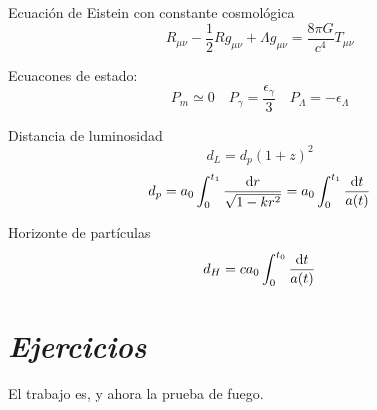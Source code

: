 \begin{multicols}{2}
\begin{Formulario}
    Ecuación de Eistein con constante cosmológica 
	\begin{equation*}
		R_{\mu \nu} - \frac{1}{2} R g_{\mu \nu} + \Lambda g_{\mu \nu} = \frac{8 \pi G}{c^4} T_{\mu \nu}
	\end{equation*}
\end{Formulario}

\begin{Formulario}
    Ecuacones de estado: 
    \begin{equation*}
    P_m \simeq 0 \quad P_\gamma = \frac{\epsilon_\gamma}{3} \quad P_\Lambda = - \epsilon_\Lambda
    \end{equation*}
\end{Formulario}    

\begin{Formulario}
    Distancia de luminosidad 
	\begin{equation*}
		d_L = d_p (1+z)^2
	\end{equation*}
	\begin{equation*}
		d_p = a_0 \int_{0}^{t_1} \frac{\mathrm{d} r}{\sqrt{1 - k r^2}} = a_0 \int_0^{t_1} \frac{\mathrm{d} t}{a(t)}
	\end{equation*}
\end{Formulario}

\begin{Formulario}
    Horizonte de partículas
	\begin{equation*}
		d_H = c a_0 \int_0^{t_0} \frac{\mathrm{d} t}{a(t)}
	\end{equation*}
\end{Formulario}
\end{multicols}



\newpage
\section*{\textit{Ejercicios}}

El trabajo es, y ahora la prueba de fuego.